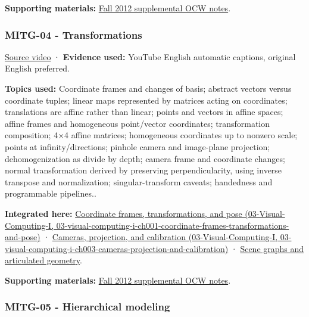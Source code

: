\textbf{Supporting materials:} \href{https://ocw.mit.edu/courses/6-837-computer-graphics-fall-2012/pages/lecture-notes/}{Fall 2012 supplemental OCW notes}.

\subsubsection{MITG-04 - Transformations}\label{04-visual-computing-ii-ch036-mitg-04---transformations}

\href{https://www.youtube.com/watch?v=WqmL_e7OGeU}{Source video} · \textbf{Evidence used:} YouTube English automatic captions, original English preferred.

\textbf{Topics used:} Coordinate frames and changes of basis; abstract vectors versus coordinate tuples; linear maps represented by matrices acting on coordinates; translations are affine rather than linear; points and vectors in affine spaces; affine frames and homogeneous point/vector coordinates; transformation composition; 4×4 affine matrices; homogeneous coordinates up to nonzero scale; points at infinity/directions; pinhole camera and image-plane projection; dehomogenization as divide by depth; camera frame and coordinate changes; normal transformation derived by preserving perpendicularity, using inverse transpose and normalization; singular-transform caveats; handedness and programmable pipelines..

\textbf{Integrated here:} \href{../03-Visual-Computing-I/main.pdf\#nameddest=03-visual-computing-i-ch001-coordinate-frames-transformations-and-pose}{Coordinate frames, transformations, and pose (03-Visual-Computing-I, 03-visual-computing-i-ch001-coordinate-frames-transformations-and-pose)} · \href{../03-Visual-Computing-I/main.pdf\#nameddest=03-visual-computing-i-ch003-cameras-projection-and-calibration}{Cameras, projection, and calibration (03-Visual-Computing-I, 03-visual-computing-i-ch003-cameras-projection-and-calibration)} · \hyperref[04-visual-computing-ii-ch029-scene-graphs-and-articulated-geometry]{Scene graphs and articulated geometry}.

\textbf{Supporting materials:} \href{https://ocw.mit.edu/courses/6-837-computer-graphics-fall-2012/pages/lecture-notes/}{Fall 2012 supplemental OCW notes}.

\subsubsection{MITG-05 - Hierarchical modeling}\label{04-visual-computing-ii-ch036-mitg-05---hierarchical-modeling}

